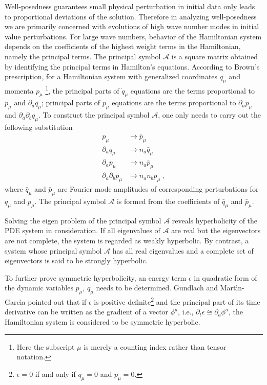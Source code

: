 Well-posedness guarantees small physical perturbation in initial data only leads to proportional deviations of the solution. Therefore in analyzing well-posedness we are primarily concerned with evolutions of high wave number modes in initial value perturbations. For large wave numbers, behavior of the Hamiltonian system depends on the coefficients of the highest weight terms in the Hamiltonian, namely the principal terms. The principal symbol $\mathcal{A}$ is a square matrix obtained by identifying the principal terms in Hamilton's equations. According to Brown's prescription\cite{Brown:2008cca}, for a Hamiltonian system with generalized coordinates $q_{\mu}$ and momenta $p_{\mu}$ \footnote{Here the subscript $\mu$ is merely a counting index rather than tensor notation.}, the principal parts of ${\dot q}_{\mu}$ equations are the terms proportional to $p_{\mu}$ and $\partial_{a}q_{\mu}$; principal parts of ${\dot p}_{\mu}$ equations are the terms proportional to $\partial_{a}p_{\mu}$ and $\partial_{a}\partial_{b}q_{\mu}$. To construct the principal symbol $\mathcal{A}$, one only needs to carry out the following substitution
\begin{subequations}\label{substitution}
\begin{align}
p_{\mu} & \rightarrow {\bar p}_{\mu}\\
\partial_{a}q_{\mu} &\rightarrow n_{a}{\bar q}_{\mu}\\
\partial_{a}p_{\mu} & \rightarrow n_{a}{\bar p}_{\mu}\\
\partial_{a}\partial_{b}p_{\mu} & \rightarrow n_{a}n_{b}{\bar p}_{\mu} \ ,
\end{align}
\end{subequations}
where ${\bar q}_{\mu}$ and ${\bar p}_{\mu}$ are Fourier mode amplitudes of corresponding perturbations for $q_{\mu}$ and $p_{\mu}$. The principal symbol $\mathcal{A}$ is formed from the coefficients of ${\bar q}_{\mu}$ and ${\bar p}_{\mu}$. 

Solving the eigen problem of the principal symbol $\mathcal{A}$ reveals hyperbolicity of the PDE system in consideration. If all eigenvalues of $\mathcal{A}$ are real but the eigenvectors are not complete, the system is regarded as weakly hyperbolic. By contrast, a system whose principal symbol $\mathcal{A}$ has all real eigenvalues and a complete set of eigenvectors is said to be strongly hyperbolic. 

To further prove symmetric hyperbolicity, an energy term $\epsilon$ in quadratic form of the dynamic variables $p_{\mu}$, $q_{\mu}$ needs to be determined. Gundlach and Mart\' \i n-Garc\' \i a\cite{Gundlach:2005ta} pointed out that if $\epsilon$ is positive definite\footnote{$\epsilon = 0$ if and only if $q_{\mu} = 0$ and $p_{\mu} = 0$.} and the principal part of its time derivative can be written as the gradient of a vector $\phi^{a}$, i.e., $\partial_{t}\epsilon \cong \partial_{a}\phi^{a}$, the Hamiltonian system is considered to be symmetric hyperbolic. 

